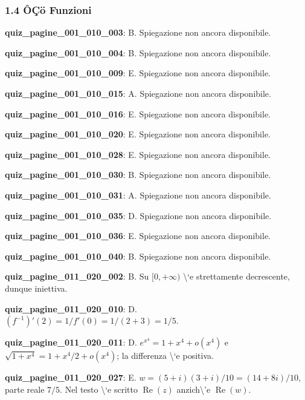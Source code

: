 \documentclass[11pt,a4paper]{article}
\newcounter{quiz}
\begin{document}
\subsubsection*{1.4 ÔÇö Funzioni}
\noindent\textbf{quiz\_pagine\_001\_010\_003}: B. Spiegazione non ancora disponibile.\par\medskip
\noindent\textbf{quiz\_pagine\_001\_010\_004}: B. Spiegazione non ancora disponibile.\par\medskip
\noindent\textbf{quiz\_pagine\_001\_010\_009}: E. Spiegazione non ancora disponibile.\par\medskip
\noindent\textbf{quiz\_pagine\_001\_010\_015}: A. Spiegazione non ancora disponibile.\par\medskip
\noindent\textbf{quiz\_pagine\_001\_010\_016}: E. Spiegazione non ancora disponibile.\par\medskip
\noindent\textbf{quiz\_pagine\_001\_010\_020}: E. Spiegazione non ancora disponibile.\par\medskip
\noindent\textbf{quiz\_pagine\_001\_010\_028}: E. Spiegazione non ancora disponibile.\par\medskip
\noindent\textbf{quiz\_pagine\_001\_010\_030}: B. Spiegazione non ancora disponibile.\par\medskip
\noindent\textbf{quiz\_pagine\_001\_010\_031}: A. Spiegazione non ancora disponibile.\par\medskip
\noindent\textbf{quiz\_pagine\_001\_010\_035}: D. Spiegazione non ancora disponibile.\par\medskip
\noindent\textbf{quiz\_pagine\_001\_010\_036}: E. Spiegazione non ancora disponibile.\par\medskip
\noindent\textbf{quiz\_pagine\_001\_010\_040}: B. Spiegazione non ancora disponibile.\par\medskip
\noindent\textbf{quiz\_pagine\_011\_020\_002}: B. Su $[0,+\infty)$ \textbackslash{}`e strettamente decrescente, dunque iniettiva.\par\medskip
\noindent\textbf{quiz\_pagine\_011\_020\_010}: D. $(f^{-1})\prime(2)=1/f\prime(0)=1/(2+3)=1/5$.\par\medskip
\noindent\textbf{quiz\_pagine\_011\_020\_011}: D. $e^{x^4}=1+x^4+o(x^4)$ e $\sqrt{1+x^4}=1+x^4/2+o(x^4)$; la differenza \textbackslash{}`e positiva.\par\medskip
\noindent\textbf{quiz\_pagine\_011\_020\_027}: E. $w=(5+i)(3+i)/10=(14+8i)/10$, parte reale $7/5$. Nel testo \textbackslash{}`e scritto $\operatorname{Re}(z)$ anzich\textbackslash{}'e $\operatorname{Re}(w)$.\par\medskip
\end{document}
